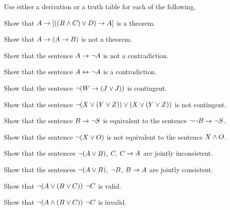 \practiceproblems
\noindent\problempart Use either a derivation or a truth table for each of the following.
\begin{compactlist}%
\item Show that $A \rightarrow [((B \wedge C) \vee D) \rightarrow A]$ is a theorem.
\item Show that $A \rightarrow (A \rightarrow B)$ is not a theorem.
\item Show that the sentence $A \rightarrow \neg{A}$ is not a contradiction.
\item Show that the sentence $A \leftrightarrow \neg A$ is a contradiction.
\item Show that the sentence $ \neg (W \rightarrow (J \vee J)) $ is contingent.
\item Show that the sentence $ \neg(X \vee (Y \vee Z)) \vee (X \vee (Y \vee Z))$ is not contingent.
 \item Show that the sentence $B \rightarrow \neg S$ is equivalent to the sentence $\neg \neg B \rightarrow \neg S$.
\item Show that the sentence $ \neg (X \vee O) $ is not equivalent to the sentence $X \wedge O$.
\item Show that the sentences $\neg(A \vee B)$, $C$, $C \rightarrow A$  are jointly inconsistent.
\item Show that the sentences $\neg(A \vee B)$, $\neg{B}$, $B \rightarrow A$ are jointly consistent.
\item Show that $\neg(A \vee (B \vee C)) $ \therefore $ \neg{C}$ is valid.
\item Show that $\neg(A \wedge (B \vee C))$ \therefore $ \neg{C}$ is invalid.
\end{compactlist}


